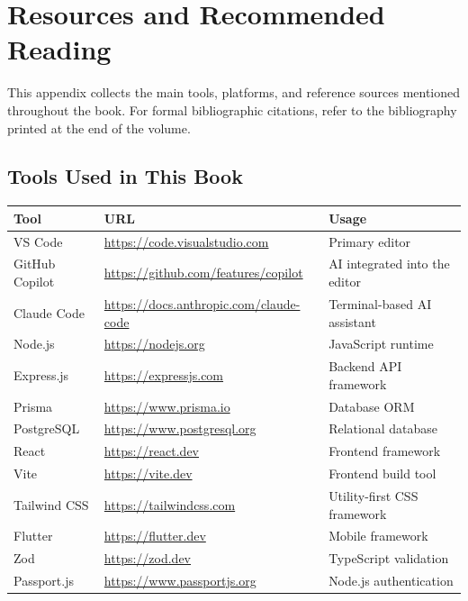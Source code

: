 \chapter{Resources and Recommended Reading}
\label{app:bibliography-resources}

This appendix collects the main tools, platforms, and reference sources mentioned throughout the book. For formal bibliographic citations, refer to the bibliography printed at the end of the volume.

\section{Tools Used in This Book}

\begin{center}
\begin{small}
\begin{tabularx}{\textwidth}{l X l}
\toprule
\textbf{Tool} & \textbf{URL} & \textbf{Usage} \\
\midrule
VS Code & \url{https://code.visualstudio.com} & Primary editor \\
GitHub Copilot & \url{https://github.com/features/copilot} & AI integrated into the editor \\
Claude Code & \url{https://docs.anthropic.com/claude-code} & Terminal-based AI assistant \\
Node.js & \url{https://nodejs.org} & JavaScript runtime \\
Express.js & \url{https://expressjs.com} & Backend API framework \\
Prisma & \url{https://www.prisma.io} & Database ORM \\
PostgreSQL & \url{https://www.postgresql.org} & Relational database \\
React & \url{https://react.dev} & Frontend framework \\
Vite & \url{https://vite.dev} & Frontend build tool \\
Tailwind CSS & \url{https://tailwindcss.com} & Utility-first CSS framework \\
Flutter & \url{https://flutter.dev} & Mobile framework \\
Zod & \url{https://zod.dev} & TypeScript validation \\
Passport.js & \url{https://www.passportjs.org} & Node.js authentication \\
\bottomrule
\end{tabularx}
\end{small}
\end{center}

